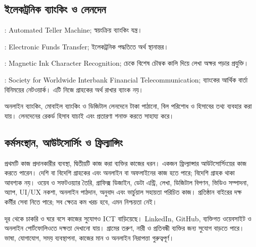 \begin{topicbody}
\subsection{ইলেকট্রনিক ব্যাংকিং ও লেনদেন}
\begin{compactpoints}
\item {}: Automated Teller Machine; স্বয়ংক্রিয় ব্যাংকিং যন্ত্র।
\item {}: Electronic Funds Transfer; ইলেকট্রনিক পদ্ধতিতে অর্থ স্থানান্তর।
\item {}: Magnetic Ink Character Recognition; চেকে বিশেষ চৌম্বক কালি দিয়ে লেখা অক্ষর পড়ার প্রযুক্তি।
\item {}: Society for Worldwide Interbank Financial Telecommunication; ব্যাংকের আর্থিক বার্তা বিনিময়ের নেটওয়ার্ক। এটি নিজে গ্রাহকের অর্থ রাখার ব্যাংক নয়।
\end{compactpoints}
অনলাইন ব্যাংকিং, মোবাইল ব্যাংকিং ও ডিজিটাল লেনদেনে টাকা পাঠানো, বিল পরিশোধ ও হিসাবের তথ্য ব্যবহার করা যায়। লেনদেনের রেকর্ড হিসাব যাচাই এবং প্রতারণা শনাক্ত করতে সাহায্য করে।

\subsection{কর্মসংস্থান, আউটসোর্সিং ও ফ্রিল্যান্সিং}
\label{sec:ch1-outsourcing}
প্রথমটি কাজ প্রদানকারীর ব্যবস্থা, দ্বিতীয়টি কাজ করা ব্যক্তির কাজের ধরন। একজন ফ্রিল্যান্সার আউটসোর্সিংয়ের কাজ করতে পারেন। দেশি বা বিদেশি গ্রাহকের এবং অনলাইন বা অফলাইনের কাজ হতে পারে; বিদেশি গ্রাহক থাকা আবশ্যক নয়।
ওয়েব ও সফটওয়্যার তৈরি, গ্রাফিক্স ডিজাইন, ডেটা এন্ট্রি, লেখা, ডিজিটাল বিপণন, ভিডিও সম্পাদনা, অ্যাপ, UI/UX নকশা, অনলাইন পাঠদান, অনুবাদ এবং ভার্চুয়াল সহায়তা পরিচিত কাজ। প্রতিষ্ঠান বাইরের দক্ষ কর্মীর সেবা নিতে পারে; সব ক্ষেত্রে কম খরচ হবে, এমন নিশ্চয়তা নেই।

দূর থেকে চাকরি ও ঘরে বসে কাজের সুযোগও ICT বাড়িয়েছে। LinkedIn, GitHub, ব্যক্তিগত ওয়েবসাইট ও অনলাইন পোর্টফোলিওতে দক্ষতা দেখানো যায়। গ্রামের তরুণ, নারী ও প্রতিবন্ধী ব্যক্তির জন্য সুযোগ বাড়তে পারে। ভাষা, যোগাযোগ, সময় ব্যবস্থাপনা, কাজের মান ও অনলাইন নিরাপত্তা গুরুত্বপূর্ণ।


\end{topicbody}
